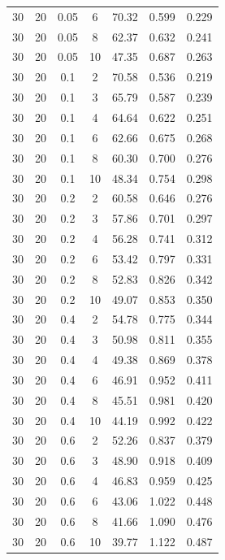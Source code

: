 \documentclass[11pt,a4paper]{article}
\begin{document}
\begin{longtable}{ccccccc}
        30 &  20  &  0.05  & 6 & 70.32 & 0.599 & 0.229 \\
        30 &  20  &  0.05  & 8 & 62.37 & 0.632 & 0.241 \\
        30 &  20  &  0.05  & 10 & 47.35 & 0.687 & 0.263 \\
        \midrule
        30 &  20  &  0.1  & 2 & 70.58 & 0.536 & 0.219 \\
        30 &  20  &  0.1  & 3 & 65.79 & 0.587 & 0.239 \\
        30 &  20  &  0.1  & 4 & 64.64 & 0.622 & 0.251 \\
        30 &  20  &  0.1  & 6 & 62.66 & 0.675 & 0.268 \\
        30 &  20  &  0.1  & 8 & 60.30 & 0.700 & 0.276 \\
        30 &  20  &  0.1  & 10 & 48.34 & 0.754 & 0.298 \\
        \midrule
        30 &  20  &  0.2  & 2 & 60.58 & 0.646 & 0.276 \\
        30 &  20  &  0.2  & 3 & 57.86 & 0.701 & 0.297 \\
        30 &  20  &  0.2  & 4 & 56.28 & 0.741 & 0.312 \\
        30 &  20  &  0.2  & 6 & 53.42 & 0.797 & 0.331 \\
        30 &  20  &  0.2  & 8 & 52.83 & 0.826 & 0.342 \\
        30 &  20  &  0.2  & 10 & 49.07 & 0.853 & 0.350 \\
        \midrule
        30 &  20  &  0.4  & 2 & 54.78 & 0.775 & 0.344 \\
        30 &  20  &  0.4  & 3 & 50.98 & 0.811 & 0.355 \\
        30 &  20  &  0.4  & 4 & 49.38 & 0.869 & 0.378 \\
        30 &  20  &  0.4  & 6 & 46.91 & 0.952 & 0.411 \\
        30 &  20  &  0.4  & 8 & 45.51 & 0.981 & 0.420 \\
        30 &  20  &  0.4  & 10 & 44.19 & 0.992 & 0.422 \\
        \midrule
        30 &  20  &  0.6  & 2 & 52.26 & 0.837 & 0.379 \\
        30 &  20  &  0.6  & 3 & 48.90 & 0.918 & 0.409 \\
        30 &  20  &  0.6  & 4 & 46.83 & 0.959 & 0.425 \\
        30 &  20  &  0.6  & 6 & 43.06 & 1.022 & 0.448 \\
        30 &  20  &  0.6  & 8 & 41.66 & 1.090 & 0.476 \\
        30 &  20  &  0.6  & 10 & 39.77 & 1.122 & 0.487 \\

\end{longtable}
\end{document}

